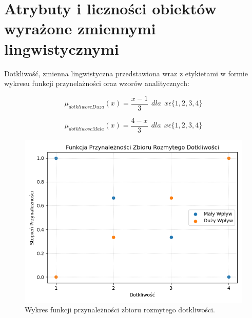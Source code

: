 \documentclass{classrep}
\begin{document}
\section{Atrybuty i liczności obiektów wyrażone zmiennymi lingwistycznymi}
Dotkliwość, zmienna lingwistyczna przedstawiona wraz z etykietami w formie wykresu funkcji przynelażności oraz wzorów analitycznych:


\begin{equation}
\mu _{dotkliwoscDuza}(x) =  \frac{x - 1}{3} \ \ dla \ \  x\epsilon \{1, 2, 3, 4\}
\end{equation}

\begin{equation}
\mu _{dotkliwoscMala}(x) =  \frac{4 - x}{3} \ \ dla \ \  x\epsilon \{1, 2, 3, 4\}
\end{equation}

\begin{figure}[h!]
 \centering
 \includegraphics[width=14cm]{FunkcjaPrzynaleznosciDotkliwosc.png}
 \vspace{-0.3cm}
 \caption{Wykres funkcji przynależności zbioru rozmytego dotkliwości. }
 \label{rysunek do eksperymentu 1 wariantu 1}
\end{figure}
\newpage
\end{document}
